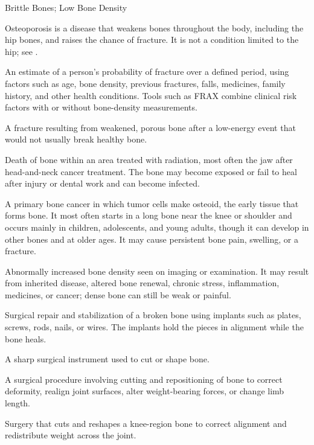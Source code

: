 \synonyms
Brittle Bones; Low Bone Density

 Osteoporosis is a disease that weakens bones throughout the body, including the hip bones, and raises the chance of fracture. It is not a condition limited to the hip; see .

 An estimate of a person's
probability of fracture over a defined period, using factors such as age, bone
density, previous fractures, falls, medicines, family history, and other health
conditions. Tools such as FRAX combine clinical risk factors with or without
bone-density measurements.

 A fracture resulting from weakened, porous bone after a low-energy event that would not usually break healthy bone.

 Death of bone within an area treated with radiation, most often the jaw after head-and-neck cancer treatment. The bone may become exposed or fail to heal after injury or dental work and can become infected.

 A primary bone cancer in which tumor cells make osteoid, the early tissue that forms bone. It most often starts in a long bone near the knee or shoulder and occurs mainly in children, adolescents, and young adults, though it can develop in other bones and at older ages. It may cause persistent bone pain, swelling, or a fracture.

 Abnormally increased bone density seen on imaging or examination. It may result from inherited disease, altered bone renewal, chronic stress, inflammation, medicines, or cancer; dense bone can still be weak or painful.

 Surgical repair and stabilization of a broken bone using implants such as plates, screws, rods, nails, or wires. The implants hold the pieces in alignment while the bone heals.

 A sharp surgical instrument used to cut or shape bone.

 A surgical procedure involving cutting and repositioning of bone to correct deformity,
realign joint surfaces, alter weight-bearing forces, or change limb length.

 Surgery that cuts and reshapes a knee-region bone to correct alignment and redistribute weight across the joint.

